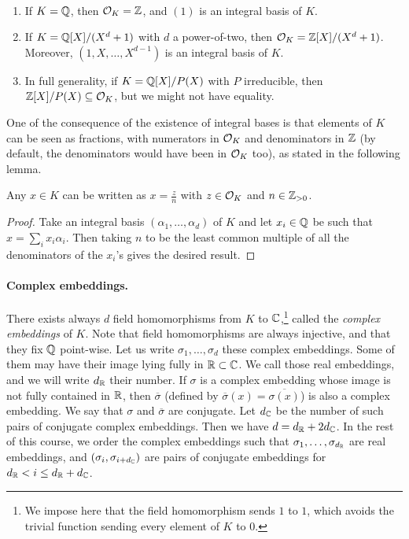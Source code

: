 \begin{example}\ 
\begin{enumerate}
\item If $K = \mathbb{Q}$, then $\mathcal{O}_K = \mathbb{Z}$, and $(1)$ is an integral basis of $K$.
\item If $K = \mathbb{Q}[X]/(X^d+1)$ with $d$ a power-of-two, then $\mathcal{O}_K = \mathbb{Z}[X]/(X^d+1)$. Moreover, $(1,X, \dots, X^{d-1})$ is an integral basis of $K$.
\item In full generality, if $K = \mathbb{Q}[X]/P(X)$ with $P$ irreducible, then $\mathbb{Z}[X]/P(X) \subseteq \mathcal{O}_K$, but we might not have equality.
\end{enumerate}
\end{example}

One of the consequence of the existence of integral bases is that elements of $K$ can be seen as fractions, with numerators in $\mathcal{O}_K$ and denominators in $\mathbb{Z}$ (by default, the denominators would have been in $\mathcal{O}_K$ too), as stated in the following lemma.
\begin{lemma}
Any $x \in K$ can be written as $x = \frac{z}{n}$ with $z \in \mathcal{O}_K$ and $n \in \mathbb{Z}_{>0}$.
\end{lemma}
\begin{proof}
Take an integral basis $(\alpha_1, \dots, \alpha_d)$ of $K$ and let $x_i \in \mathbb{Q}$ be such that $x = \sum_i x_i \alpha_i$. Then taking $n$ to be the least common multiple of all the denominators of the $x_i$'s gives the desired result.
\end{proof}

\paragraph{Complex embeddings.} There exists always $d$ field homomorphisms from $K$ to $\mathbb{C}$,\footnote{We impose here that the field homomorphism sends $1$ to $1$, which avoids the trivial function sending every element of $K$ to $0$.} called the \emph{complex embeddings} of $K$. Note that field homomorphisms are always injective, and that they fix $\mathbb{Q}$ point-wise. Let us write $\sigma_1, \dots, \sigma_d$ these complex embeddings. Some of them may have their image lying fully in $\mathbb{R} \subset \mathbb{C}$. We call those real embeddings, and we will write $d_{\mathbb{R}}$ their number. If $\sigma$ is a complex embedding whose image is not fully contained in $\mathbb{R}$, then $\overline{\sigma}$ (defined by $\overline{\sigma}(x) = \overline{\sigma(x)}$) is also a complex embedding. We say that $\sigma$ and $\overline{\sigma}$ are conjugate. Let $d_{\mathbb{C}}$ be the number of such pairs of conjugate complex embeddings. Then we have $d = d_{\mathbb{R}} + 2 d_{\mathbb{C}}$. In the rest of this course, we order the complex embeddings such that $\sigma_1, \dots, \sigma_{d_{\mathbb{R}}}$ are real embeddings, and $(\sigma_i, \sigma_{i+d_{\mathbb{C}}})$ are pairs of conjugate embeddings for $d_{\mathbb{R}} < i \leq d_{\mathbb{R}}+d_{\mathbb{C}}$.

